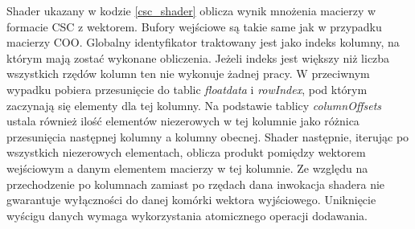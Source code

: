 Shader ukazany w kodzie \ref{csc_shader} oblicza wynik mnożenia macierzy w formacie CSC z wektorem.
Bufory wejściowe są takie same jak w przypadku macierzy COO.
Globalny identyfikator traktowany jest jako indeks kolumny, na którym mają zostać wykonane obliczenia.
Jeżeli indeks jest większy niż liczba wszystkich rzędów kolumn ten nie wykonuje żadnej pracy.
W przeciwnym wypadku pobiera przesunięcie do tablic \textit{floatdata} i \textit{rowIndex}, pod którym zaczynają się elementy dla tej kolumny.
Na podstawie tablicy \textit{columnOffsets} ustala również ilość elementów niezerowych w tej kolumnie jako różnica przesunięcia następnej kolumny a kolumny obecnej.
Shader następnie, iterując po wszystkich niezerowych elementach, oblicza produkt pomiędzy wektorem wejściowym a danym elementem macierzy w tej kolumnie.
Ze względu na przechodzenie po kolumnach zamiast po rzędach dana inwokacja shadera nie gwarantuje wyłączności do danej komórki wektora wyjściowego.
Uniknięcie wyścigu danych wymaga wykorzystania atomicznego operacji dodawania.

